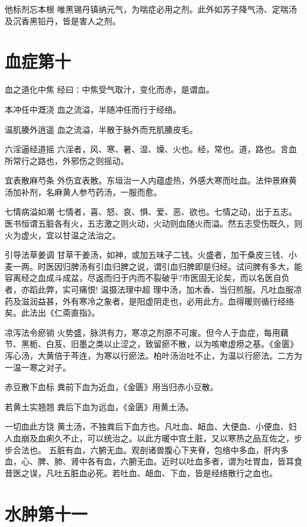 \documentclass[a4paper,12pt,UTF8,twoside]{ctexbook}
\begin{document}
    他标剂忘本根
    唯黑锡丹镇纳元气，为喘症必用之剂。此外如苏子降气汤、定喘汤及沉香黑铅丹，皆是害人之剂。
    
    \section{血症第十}
    血之道化中焦
    经曰∶中焦受气取汁，变化而赤，是谓血。
    
    本冲任中溉浇
    血之流溢，半随冲任而行于经络。
    
    温肌腠外逍遥
    血之流溢，半散于脉外而充肌腠皮毛。
    
    六淫逼经道摇
    六淫者，风、寒、暑、湿、燥、火也。经，常也。道，路也。言血所常行之路也，外邪伤之则摇动。
    
    宜表散麻芍条
    外伤宜表散。东垣治一人内蕴虚热，外感大寒而吐血。法仲景麻黄汤加补剂，名麻黄人参芍药汤，一服而愈。
    
    七情病溢如潮
    七情者，喜、怒、哀、惧、爱、恶、欲也。七情之动，出于五志。医书恒谓五脏各有火，五志激之则火动，火动则血随火而溢。然五志受伤既久，则火为虚火，宜以甘温之法治之。
    
    引导法草姜调
    甘草干姜汤，如神，或加五味子二钱。火盛者，加干桑皮三钱、小麦一两。时医因归脾汤有引血归脾之说，谓引血归脾即是归经。试问脾有多大，能容离经之血成斗成盆，尽返而归于内而不裂破乎?市医固无论矣，而以名医自负者，亦蹈此弊，实可痛恨!
    温摄法理中超
    理中汤，加木香、当归煎服。凡吐血服凉药及滋润益甚，外有寒冷之象者，是阳虚阴走也，必用此方。血得暖则循行经络矣。此法出《仁斋直指》。
    
    凉泻法令瘀销
    火势盛，脉洪有力，寒凉之剂原不可废。但今人于血症，每用藕节、黑栀、白芨、旧墨之类以止涩之，致留瘀不散，以为咳嗽虚痨之基。《金匮》泻心汤，大黄倍于芩连，为寒以行瘀法。柏叶汤治吐不止，为温以行瘀法。二方为一温一寒之对子。
    
    赤豆散下血标
    粪前下血为近血，《金匮》用当归赤小豆散。
    
    若黄土实翘翘
    粪后下血为远血，《金匮》用黄土汤。
    
    一切血此方饶
    黄土汤，不独粪后下血方也。凡吐血、衄血、大便血、小便血、妇人血崩及血痢久不止，可以统治之。以此方暖中宫土脏，又以寒热之品互佐之，步步合法也。
    五脏有血，六腑无血。观剖诸兽腹心下夹脊，包络中多血，肝内多血，心、脾、肺、肾中各有血，六腑无血。近时以吐血多者，谓为吐胃血，皆耳食昔医之误，凡吐五脏血必死。若吐血、衄血、下血，皆是经络散行之血也。
    
    \section{水肿第十一}
    
\end{document}
